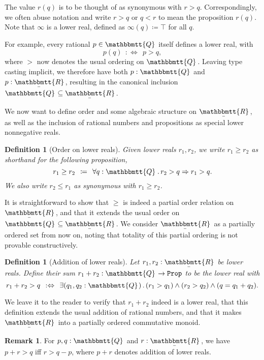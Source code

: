 \documentclass[reqno,11pt]{amsproc}
\theoremstyle{plain}
\newtheorem{definition}[theorem]{Definition}
\theoremstyle{definition}
\newtheorem{remark}[theorem]{Remark}
\newcommand{\Const}[1]{\mathtt{#1}}
\renewcommand{\to}[1][]{\xrightarrow{#1}}
\newcommand{\ubar}[1]{\underaccent{\bar}{#1}}
\newcommand{\internal}[1]{\raisebox{-.03ex}{$\mathbbmtt{#1}$}}
\newcommand{\hs}{\hspace{1pt}}
\newcommand{\tqq}{\internal{Q}\hs}
\newcommand{\trr}{\internal{R}}
\newcommand{\tlrr}{\ubar{\trr}\hs}
\newcommand{\prop}{\Const{Prop}}
\newcommand{\imp}{\Rightarrow}
\renewcommand{\iff}{\Leftrightarrow}
\numberwithin{equation}{section}
\begin{document}
The value $r(q)$ is to be thought of as synonymous with $r > q$.
Correspondingly, we often abuse notation and write $r > q$ or $q < r$ to mean the proposition $r(q)$. Note that $\infty$ is a lower real, defined as $\infty(q) \coloneqq \top$ for all $q$.

For example, every rational $p \in \tqq$ itself defines a lower real, with
\[
	p(q) \:\::\iff\:\: p > q,
\]
where $>$ now denotes the usual ordering on $\tqq$. Leaving type casting implicit, we therefore have both $p : \tqq$ and $p : \tlrr$, resulting in the canonical inclusion $\tqq \subseteq \tlrr$.

We now want to define order and some algebraic structure on $\tlrr$, as well as the inclusion of rational numbers and propositions as special lower nonnegative reals.

\begin{definition}[Order on lower reals]
Given lower reals $r_1,r_2$,
we write $r_1 \ge r_2$ as shorthand for the following proposition,
\begin{equation}\label{eqn.real_order}
	r_1 \ge r_2 \:\:\coloneqq\:\: \forall q:\tqq \, . \, r_2 > q \imp r_1 > q.
\end{equation}
We also write $r_2 \le r_1$ as synonymous with $r_1 \ge r_2$.
\end{definition}

It is straightforward to show that $\ge$ is indeed a partial order relation on $\tlrr$, and that it extends the usual order on $\tqq \subseteq \tlrr$. We consider $\tlrr$ as a partially ordered set from now on, noting that totality of this partial ordering is not provable constructively.

\begin{definition}[Addition of lower reals]\label{def.sum_lr}
Let $r_1,r_2:\tlrr$ be lower reals. Define their \emph{sum} $r_1 + r_2 : \tqq\to\prop$ to be the lower real with
\begin{equation}\label{eqn.sum_lr}
r_1+r_2 > q \:\::\iff\:\: \exists (q_1,q_2:\tqq) \,.\, (r_1>q_1)\land (r_2> q_2)\land (q=q_1+q_2).
\end{equation}
\end{definition}

We leave it to the reader to verify that $r_1 + r_2$ indeed is a lower real, that this definition extends the usual addition of rational numbers, and that it makes $\tlrr$ into a partially ordered commutative monoid.

\begin{remark}
	\label{rational_ineq_move}
	For $p,q : \tqq$ and $r : \tlrr$, we have $p + r > q$ iff $r > q - p$, where $p + r$ denotes addition of lower reals.
\end{remark}
\end{document}
